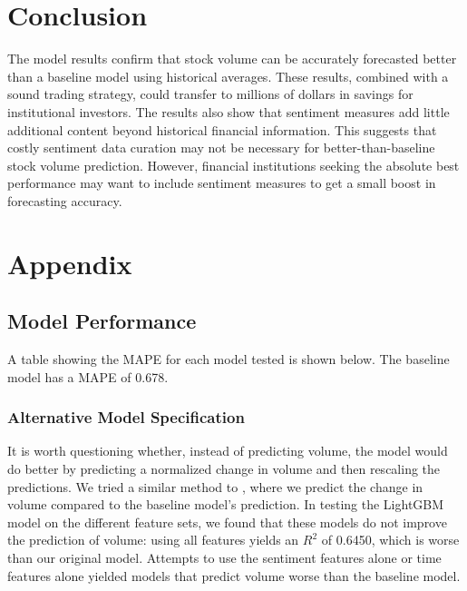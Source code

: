 \documentclass[12pt]{article}
\begin{document}
\section{Conclusion}
\label{section:conclusion}
The model results confirm that stock volume can be accurately forecasted better than a baseline model using historical averages. These results, combined with a sound trading strategy, could transfer to millions of dollars in savings for institutional investors. The results also show that sentiment measures add little additional content beyond historical financial information. This suggests that costly sentiment data curation may not be necessary for better-than-baseline stock volume prediction. However, financial institutions seeking the absolute best performance may want to include sentiment measures to get a small boost in forecasting accuracy.

\newpage
\printbibliography
\newpage

\section{Appendix}
\subsection{Model Performance}
\label{section:appendix_model_performance}
A table showing the MAPE for each model tested is shown below. The baseline model has a MAPE of 0.678.


\subsubsection{Alternative Model Specification}
It is worth questioning whether, instead of predicting volume, the model would do better by predicting a normalized change in volume and then rescaling the predictions. We tried a similar method to \textcite{goyenko2024trading}, where we predict the change in volume compared to the baseline model's prediction. In testing the LightGBM model on the different feature sets, we found that these models do not improve the prediction of volume: using all features yields an $R^2$ of 0.6450, which is worse than our original model. Attempts to use the sentiment features alone or time features alone yielded models that predict volume worse than the baseline model.
\end{document}
